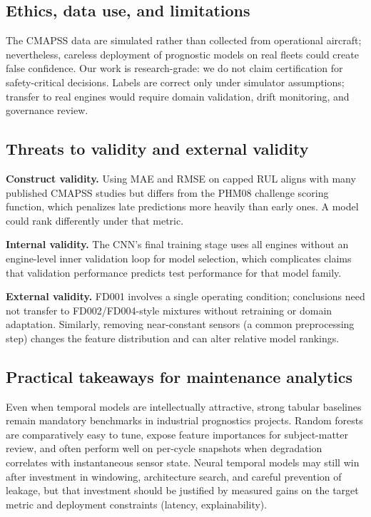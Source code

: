 \documentclass[11pt]{article}
\begin{document}
\subsection{Ethics, data use, and limitations}
The CMAPSS data are simulated rather than collected from operational aircraft; nevertheless, careless deployment of prognostic models on real fleets could create false confidence. Our work is research-grade: we do not claim certification for safety-critical decisions. Labels are correct only under simulator assumptions; transfer to real engines would require domain validation, drift monitoring, and governance review.

\subsection{Threats to validity and external validity}
\textbf{Construct validity.} Using MAE and RMSE on capped RUL aligns with many published CMAPSS studies but differs from the PHM08 challenge scoring function, which penalizes late predictions more heavily than early ones. A model could rank differently under that metric.

\textbf{Internal validity.} The CNN's final training stage uses all engines without an engine-level inner validation loop for model selection, which complicates claims that validation performance predicts test performance for that model family.

\textbf{External validity.} FD001 involves a single operating condition; conclusions need not transfer to FD002/FD004-style mixtures without retraining or domain adaptation. Similarly, removing near-constant sensors (a common preprocessing step) changes the feature distribution and can alter relative model rankings.

\subsection{Practical takeaways for maintenance analytics}
Even when temporal models are intellectually attractive, strong tabular baselines remain mandatory benchmarks in industrial prognostics projects. Random forests are comparatively easy to tune, expose feature importances for subject-matter review, and often perform well on per-cycle snapshots when degradation correlates with instantaneous sensor state. Neural temporal models may still win after investment in windowing, architecture search, and careful prevention of leakage, but that investment should be justified by measured gains on the target metric and deployment constraints (latency, explainability).
\end{document}
